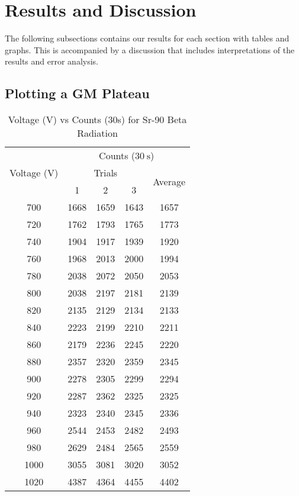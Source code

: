 \documentclass[11pt]{article}
\begin{document}
	
\clearpage

	\section{Results and Discussion}

	The following subsections contains our results for each section with tables and graphs. This is accompanied by a discussion that includes interpretations of the results and error analysis.
	
	\subsection{Plotting a GM Plateau}
	
	\begin{table}[htbp]
		\centering
		\caption{Voltage ($\unit{\volt}$) vs Counts (30s) for Sr-90 Beta Radiation}
		\begin{tabular}{ccccc}
			\toprule
			\multirow{3}[6]{*}{Voltage ($\unit{\volt}$)} & \multicolumn{4}{c}{Counts ($\qty{30}{\second}$)} \\
			\cmidrule{2-5}      & \multicolumn{3}{c}{Trials} & \multirow{2}[4]{*}{Average} \\
			\cmidrule{2-4}      & 1 & 2 & 3 &  \\
			\midrule
			700 & 1668 & 1659 & 1643 & 1657 \\
			720 & 1762 & 1793 & 1765 & 1773 \\
			740 & 1904 & 1917 & 1939 & 1920 \\
			760 & 1968 & 2013 & 2000 & 1994 \\
			780 & 2038 & 2072 & 2050 & 2053 \\
			800 & 2038 & 2197 & 2181 & 2139 \\
			820 & 2135 & 2129 & 2134 & 2133 \\
			840 & 2223 & 2199 & 2210 & 2211 \\
			860 & 2179 & 2236 & 2245 & 2220 \\
			880 & 2357 & 2320 & 2359 & 2345 \\
			900 & 2278 & 2305 & 2299 & 2294 \\
			920 & 2287 & 2362 & 2325 & 2325 \\
			940 & 2323 & 2340 & 2345 & 2336 \\
			960 & 2544 & 2453 & 2482 & 2493 \\
			980 & 2629 & 2484 & 2565 & 2559 \\
			1000 & 3055 & 3081 & 3020 & 3052 \\
			1020 & 4387 & 4364 & 4455 & 4402 \\
			\bottomrule
		\end{tabular}%
		\label{tab:1_Table}%
	\end{table}%
	
\end{document}
